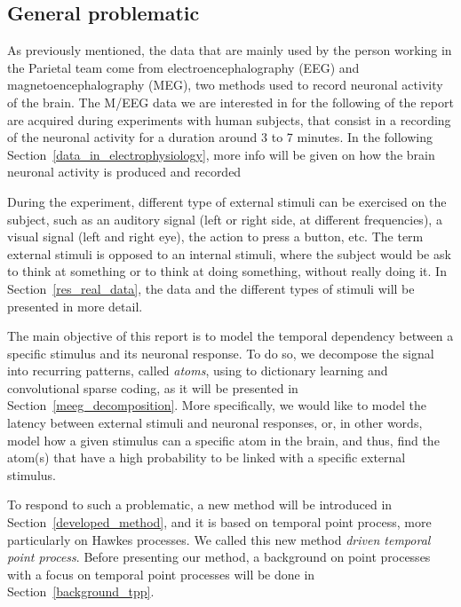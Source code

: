 \subsection{General problematic}

As previously mentioned, the data that are mainly used by the person working in the Parietal team come from electroencephalography (EEG) and magnetoencephalography (MEG), two methods used to record neuronal activity of the brain.
The M/EEG data we are interested in for the following of the report are acquired during experiments with human subjects, that consist in a recording of the neuronal activity for a duration around 3 to 7 minutes.
In the following Section~\ref{data_in_electrophysiology}, more info will be given on how the brain neuronal activity is produced and recorded

During the experiment, different type of external stimuli can be exercised on the subject, such as an auditory signal (left or right side, at different frequencies), a visual signal (left and right eye), the action to press a button, etc.
The term external stimuli is opposed to an internal stimuli, where the subject would be ask to think at something or to think at doing something, without really doing it.
In Section~\ref{res_real_data}, the data and the different types of stimuli will be presented in more detail.

The main objective of this report is to model the temporal dependency between a specific stimulus and its neuronal response.
To do so, we decompose the signal into recurring patterns, called \textit{atoms}, using to dictionary learning and convolutional sparse coding, as it will be presented in Section~\ref{meeg_decomposition}.
More specifically, we would like to model the latency between external stimuli and neuronal responses, or, in other words, model how a given stimulus can  a specific atom in the brain, and thus, find the atom(s) that have a high probability to be linked with a specific external stimulus.

To respond to such a problematic, a new method will be introduced in Section~\ref{developed_method}, and it is based on temporal point process, more particularly on Hawkes processes.
We called this new method \textit{driven temporal point process}.
Before presenting our method, a background on point processes with a focus on temporal point processes will  be done  in Section~\ref{background_tpp}.

 